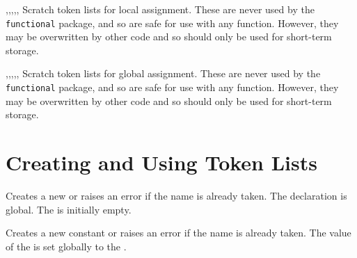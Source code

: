\documentclass[oneside]{book}
\begin{document}

\begin{variable}{\lTmpaTl,\lTmpbTl,\lTmpcTl,\lTmpiTl,\lTmpjTl,\lTmpkTl}
Scratch token lists for local assignment. These are never used by
the \verb!functional! package, and so are safe for use with any
function. However, they may be overwritten by other
code and so should only be used for short-term storage.
\end{variable}

\begin{variable}{\gTmpaTl,\gTmpbTl,\gTmpcTl,\gTmpiTl,\gTmpjTl,\gTmpkTl}
Scratch token lists for global assignment. These are never used by
the \verb!functional! package, and so are safe for use with any
function. However, they may be overwritten by other
code and so should only be used for short-term storage.
\end{variable}

\section{Creating and Using Token Lists}

\begin{function}{\TlNew}
\begin{syntax}
 
\end{syntax}
Creates a new  or raises an error if the
name is already taken. The declaration is global. The
 is initially empty.
\begin{codehigh}
\TlNew \lFooSomeTl
\end{codehigh}
\end{function}

\begin{function}{\TlConst}
\begin{syntax}
  
\end{syntax}
Creates a new constant  or raises an error
if the name is already taken. The value of the
 is set globally to the .
\begin{codehigh}
\TlConst {}
\end{codehigh}
\end{function}
\end{document}
